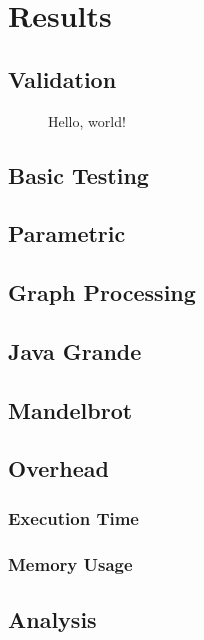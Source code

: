 \chapter{Results} \label{chp:results}
\section{Validation} \label{sec:results/validation}
\lipsum[1]

\begin{figure}
	\centering
	\caption{Hello, world!}
\end{figure}

\lipsum[2-6]

\section{Basic Testing} \label{sec:results/basic}

\section{Parametric} \label{sec:results/parametric}

\section{Graph Processing} \label{sec:results/graph}

\section{Java Grande} \label{sec:results/grande}

\section{Mandelbrot} \label{sec:results/mandelbrot}

\section{Overhead} \label{sec:results/overhead}
	\subsection{Execution Time} \label{sec:results/overhead/time}
	
	\subsection{Memory Usage} \label{sec:results/overhead/memory}

\section{Analysis} \label{sec:results/analysis}